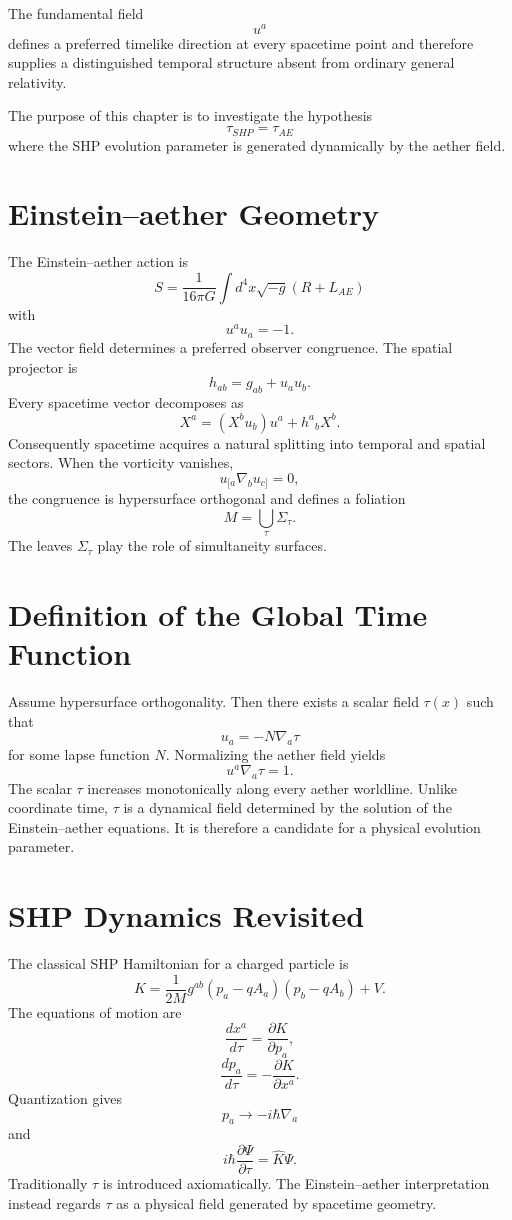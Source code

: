 \documentclass[11pt]{book}
\begin{document}
The fundamental field
\[u^a\]
defines a preferred timelike direction at every spacetime point and
therefore supplies a distinguished temporal structure absent from
ordinary general relativity.

The purpose of this chapter is to investigate the hypothesis
\[\boxed{\tau_{SHP}=\tau_{AE}}\]
where the SHP evolution parameter is generated dynamically by the
aether field.

\section{Einstein--aether Geometry}
The Einstein--aether action is
\[S=\frac{1}{16\pi G}\int d^4x\sqrt{-g}\left(R+L_{AE}\right)\]
with
\[u^a u_a=-1.\]
The vector field determines a preferred observer congruence.
The spatial projector is
\[h_{ab}=g_{ab}+u_a u_b.\]
Every spacetime vector decomposes as
\[X^a=(X^b u_b)u^a+h^a{}_bX^b .\]
Consequently spacetime acquires a natural splitting into temporal and
spatial sectors.
When the vorticity vanishes,
\[u_{[a}\nabla_bu_{c]}=0,\]
the congruence is hypersurface orthogonal and defines a foliation
\[M=\bigcup_{\tau}\Sigma_\tau .\]
The leaves $\Sigma_\tau$ play the role of simultaneity surfaces.

\section{Definition of the Global Time Function}
Assume hypersurface orthogonality.
Then there exists a scalar field $\tau(x)$ such that
\[u_a=-N\nabla_a\tau\]
for some lapse function $N$.
Normalizing the aether field yields
\[u^a\nabla_a\tau=1 .\]
The scalar $\tau$ increases monotonically along every aether worldline.
Unlike coordinate time, $\tau$ is a dynamical field determined by the
solution of the Einstein--aether equations.
It is therefore a candidate for a physical evolution parameter.

\section{SHP Dynamics Revisited}
The classical SHP Hamiltonian for a charged particle is
\[K=\frac{1}{2M}g^{ab}\left(p_a-qA_a\right)\left(p_b-qA_b\right)+V.\]
The equations of motion are
\[\frac{dx^a}{d\tau}=\frac{\partial K}{\partial p_a},\]
\[\frac{dp_a}{d\tau}=-\frac{\partial K}{\partial x^a}.\]
Quantization gives
\[p_a\rightarrow-i\hbar\nabla_a\]
and
\[i\hbar\frac{\partial\Psi}{\partial\tau}=\hat K\Psi.\]
Traditionally $\tau$ is introduced axiomatically.
The Einstein--aether interpretation instead regards $\tau$ as a
physical field generated by spacetime geometry.
\end{document}
